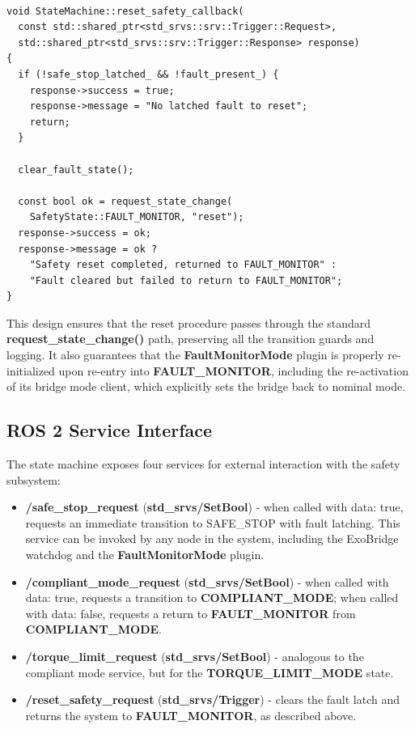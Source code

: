 \begin{verbatim}

void StateMachine::reset_safety_callback(
  const std::shared_ptr<std_srvs::srv::Trigger::Request>,
  std::shared_ptr<std_srvs::srv::Trigger::Response> response)
{
  if (!safe_stop_latched_ && !fault_present_) {
    response->success = true;
    response->message = "No latched fault to reset";
    return;
  }

  clear_fault_state();

  const bool ok = request_state_change(
    SafetyState::FAULT_MONITOR, "reset");
  response->success = ok;
  response->message = ok ?
    "Safety reset completed, returned to FAULT_MONITOR" :
    "Fault cleared but failed to return to FAULT_MONITOR";
}

\end{verbatim}

This design ensures that the reset procedure passes through the standard \textbf{request\_state\_change()} path, preserving all the transition guards and logging. It also guarantees that the \textbf{FaultMonitorMode} plugin is properly re-initialized upon re-entry into \textbf{FAULT\_MONITOR}, including the re-activation of its bridge mode client, which explicitly sets the bridge back to nominal mode.

\subsection{ROS 2 Service Interface}
The state machine exposes four services for external interaction with the safety subsystem:

\begin{itemize}
    \item \textbf{/safe\_stop\_request} (\textbf{std\_srvs/SetBool}) - when called with data: true, requests an immediate transition to SAFE\_STOP with fault latching. This service can be invoked by any node in the system, including the ExoBridge watchdog and the \textbf{FaultMonitorMode} plugin.
    \item \textbf{/compliant\_mode\_request} (\textbf{std\_srvs/SetBool}) - when called with data: true, requests a transition to \textbf{COMPLIANT\_MODE}; when called with data: false, requests a return to \textbf{FAULT\_MONITOR} from \textbf{COMPLIANT\_MODE}.
    \item \textbf{/torque\_limit\_request} (\textbf{std\_srvs/SetBool}) - analogous to the compliant mode service, but for the \textbf{TORQUE\_LIMIT\_MODE} state.
    \item \textbf{/reset\_safety\_request} (\textbf{std\_srvs/Trigger}) - clears the fault latch and returns the system to \textbf{FAULT\_MONITOR}, as described above.
\end{itemize}

